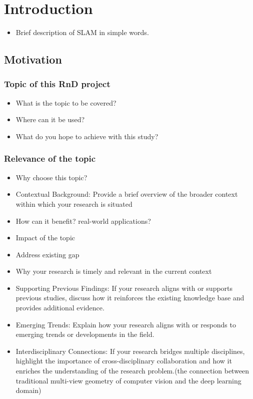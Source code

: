 \documentclass[report.tex]{subfiles}
\begin{document}
    \chapter{Introduction}

    \begin{itemize}
        \item Brief description of SLAM in simple words.
    \end{itemize}
    
    
    \section{Motivation}
    \subsection{Topic of this RnD project}
    \begin{itemize}
        \item What is the topic to be covered?
        \item Where can it be used?
        \item What do you hope to achieve with this study?
    \end{itemize}

    \subsection{Relevance of the topic}
    \begin{itemize}
        \item Why choose this topic?
        \item Contextual Background: Provide a brief overview of the broader context within which your research is situated
        \item How can it benefit? real-world applications?
        \item Impact of the topic
        \item Address existing gap
        \item Why your research is timely and relevant in the current context
        \item Supporting Previous Findings: If your research aligns with or supports previous studies, discuss how it reinforces the existing knowledge base and provides additional evidence.
        \item Emerging Trends: Explain how your research aligns with or responds to emerging trends or developments in the field.
        \item Interdisciplinary Connections: If your research bridges multiple disciplines, highlight the importance of cross-disciplinary collaboration and how it enriches the understanding of the research problem.(the connection between traditional multi-view geometry of computer vision and the deep learning domain)
    \end{itemize}
\end{document}
